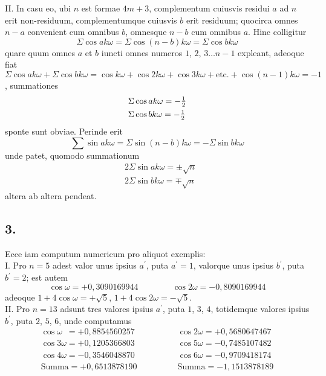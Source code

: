 \documentclass[twoside,12pt, showframe]{memoir}
\let\oldfrac\frac
\def\frac#1#2{\mathchoice{\tfrac{#1}{#2}}{\oldfrac{#1}{#2}}{\genfrac{}{}{}{2}{#1}{#2\mathstrut}}{\genfrac{}{}{}{3}{#1}{#2\mathstrut}}}
\begin{document}
II. In casu eo, ubi \(n\) est formae \(4 m+3\), complementum cuiusvis residui \(a\) ad \(n\) erit non-residuum, complementumque cuiusvis \(b\) erit residuum; quocirca omnes \(n-a\) convenient cum omnibus \(b\), omnesque \(n-b\) cum omnibus \(a\). Hinc colligitur
\[\Sigma \cos a k \omega=\Sigma \cos (n-b) k \omega=\Sigma \cos b k \omega\]
quare quum omnes \(a\) et \(b\) iuncti omnes numeros \(1\), \(2\), \(3 \ldots n-1\) expleant, adeoque fiat \(\Sigma \cos a k \omega+\Sigma \cos b k \omega=\cos k \omega+\cos 2 k \omega+\cos 3 k \omega+\text{etc.}+\cos (n-1) k \omega=-1\), summationes
\[\begin{aligned}
& \Sigma \cos a k \omega=-\frac{1}{2} \\
& \Sigma \cos b k \omega=-\frac{1}{2}
\end{aligned}\]
sponte sunt obviae. Perinde erit
\[\sum \sin a k \omega=\Sigma \sin (n-b) k \omega=-\Sigma \sin b k \omega\]\clearpage\noindent%
unde patet, quomodo summationum
\[\begin{aligned}
& 2 \Sigma \sin a k \omega= \pm \surd n \\
& 2 \Sigma \sin b k \omega= \mp \surd n
\end{aligned}\]
altera ab altera pendeat.

\subsection*{3.}
 
Ecce iam computum numericum pro aliquot exemplis:\\
 
I. Pro \(n=5\) adest valor unus ipsius \(a^{\prime}\), puta \(a^{\prime}=1\), valorque unus ipsius \(b^{\prime}\), puta \(b^{\prime}=2\); est autem
\[\cos \omega=+0{,}3090169944 \qquad \qquad \cos 2 \omega=-0{,}8090169944\]
adeoque \(1+4 \cos \omega=+\surd 5\), \(1+4 \cos 2 \omega=-\surd 5\).\\

II. Pro \(n=13\) adsunt tres valores ipsius \(a^{\prime}\), puta \(1\), \(3\), \(4\), totidemque valores ipsius \(b^{\prime}\), puta \(2\), \(5\), \(6\), unde computamus
\[ \begin{array}{r} 
\cos \omega\phantom{1} = + 0{,}8854560257 \\
\cos 3\omega = + 0{,}1205366803 \\ 
\cos 4 \omega = - 0{,}3546048870 \\  
\hline \text{Summa} = + 0{,}6513878190 \end{array} 
\qquad \qquad
\begin{array}{r} 
\cos 2\omega = + 0{,}5680647467 \\ 
\cos 5\omega = - 0{,}7485107482 \\ 
\cos 6 \omega = - 0{,}9709418174 \\ 
\hline \text{Summa} = - 1{,}1513878189 \end{array} \]
 
\end{document}
